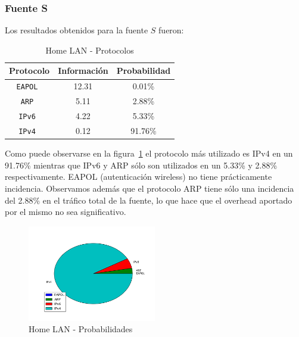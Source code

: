 \documentclass[final,inline,narroweqnarray,a4paper]{ieee}
\begin{document}
\subsubsection{Fuente S}

Los resultados obtenidos para la fuente $S$ fueron:

\begin{table}[H]
    \begin{center}
        \begin{tabular}{|c|c|c|}
            \hline
            \textbf{Protocolo} & \textbf{Información} & \textbf{Probabilidad} \\ \hline
            \texttt{EAPOL     }& 12.31       & 0.01\%     \\ \hline
            \texttt{ARP       }& 5.11        & 2.88\%     \\ \hline
            \texttt{IPv6      }& 4.22        & 5.33\%     \\ \hline
            \texttt{IPv4      }& 0.12        & 91.76\%    \\ \hline
        \end{tabular}
        \caption{Home LAN - Protocolos}
        \label{table:homelanS}
    \end{center}
\end{table}

Como puede observarse en la figura~\ref{torta:homelanS} el protocolo más utilizado es IPv4 en un 91.76\% mientras que IPv6 y ARP sólo son utilizados en un 5.33\% y 2.88\% respectivamente. EAPOL (autenticación wireless) no tiene prácticamente incidencia.
Observamos además que el protocolo ARP tiene sólo una incidencia del 2.88\% en el tráfico total de la fuente, lo que hace que el overhead aportado por el mismo no sea significativo. 

\begin{figure}[H]
    \begin{center}
        \includegraphics[width=0.5\textwidth]{plot/homelanS-pie.png}
        \caption{Home LAN - Probabilidades}
        \label{torta:homelanS}
    \end{center}
\end{figure}
\end{document}
